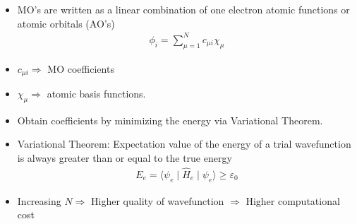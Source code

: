 \documentclass[slidestop,mathserif,compress,xcolor=svgnames]{beamer}
\begin{document}
\begin{frame}
  \begin{block}{}
    \begin{itemize}
      \item MO's are written as a linear combination of one electron atomic functions or atomic orbitals (AO's)
      \begin{align*}
	\phi_i = \sum^N_{\mu=1}c_{\mu i}\chi_\mu
      \end{align*}
      \item[]$c_{\mu i} \Rightarrow$ MO coefficients
      \item[]$\chi_\mu\Rightarrow$ atomic basis functions.
      \item Obtain coefficients by minimizing the energy via Variational Theorem.
      \item Variational Theorem: Expectation value of the energy of a trial wavefunction is always greater than or equal to the true energy
      \begin{align*}
	E_e = \langle\psi_e\mid\hat{H}_e\mid\psi_e\rangle \ge \varepsilon_0
      \end{align*}
      \item Increasing $N \Rightarrow$ Higher quality of wavefunction $\Rightarrow$ Higher computational cost
    \end{itemize}
  \end{block}
\end{frame}
\end{document}
